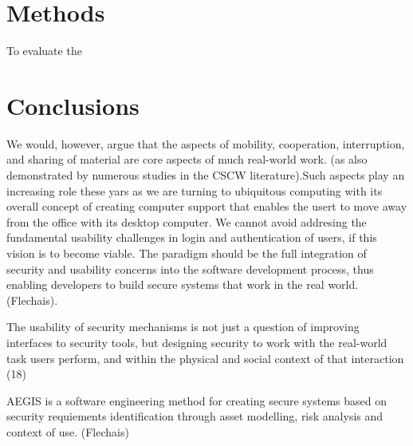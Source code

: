 \documentclass{article}
\begin{document}
\section{Methods}

To evaluate the 

\section{Conclusions}

We would, however, argue that the aspects of mobility, cooperation, interruption, and sharing of material are core aspects of much real-world work. (as also demonstrated by numerous studies in the CSCW literature).Such aspects play an increasing role these yars as we are turning to ubiquitous computing with its overall concept of creating computer support that enables the usert to move away from the office with its desktop computer. We cannot avoid addresing the fundamental usability challenges in login and authentication of users, if this vision is to become viable. 
The paradigm should be the full integration of security and usability concerns into the software development process, thus enabling developers to build secure systems that work in the real world. (Flechais). 

The usability of security mechanisms is not just a question of improving interfaces to security tools, but designing security to work with the real-world task users perform, and within the physical and social context of that interaction (18)

AEGIS is a software engineering method for creating secure systems based on security requiements identification through asset modelling, risk analysis and context of use. (Flechais) 
\end{document}
